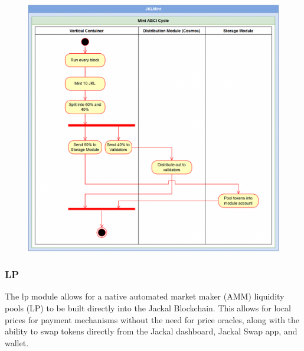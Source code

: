 \documentclass[a4paper]{article}
\begin{document}
\begin{figure}[!htbp]
\centering
\includegraphics[width=1\textwidth]{assets/mint.png}
\caption{}
\end{figure}

\newpage

\subsubsection{LP}
The lp module allows for a native automated market maker (AMM) liquidity pools (LP) to be built directly into the Jackal Blockchain. This allows for local prices for payment mechanisms without the need for price oracles, along with the ability to swap tokens directly from the Jackal dashboard, Jackal Swap app, and wallet. 
\end{document}

